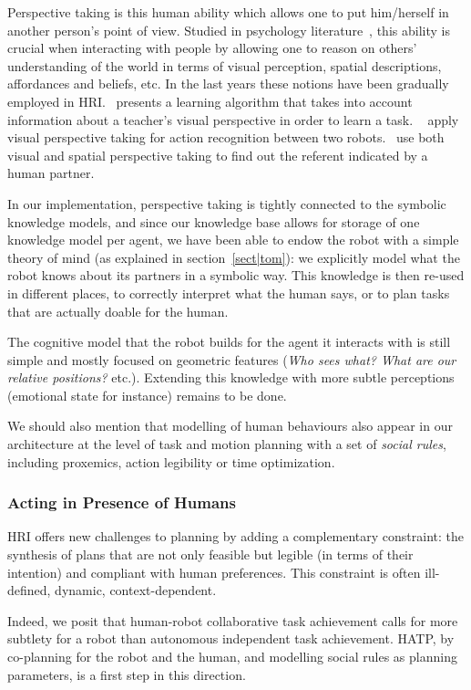 \documentclass[preprint,3p,times]{elsarticle}
\begin{document}
Perspective taking is this human ability which allows one to put him/herself in
another person's point of view. Studied in psychology
literature~\cite{Flavell1992,Tversky1999}, this ability is crucial when
interacting with people by allowing one to reason on others' understanding of
the world in terms of visual perception, spatial descriptions, affordances and
beliefs, etc.  In the last years these notions have been gradually employed in
HRI.~\cite{Breazeal2006} presents a learning algorithm that takes into account
information about a teacher's visual perspective in order to learn a task.
~\cite{Johnson2005} apply visual perspective taking for action recognition
between two robots.~\cite{Trafton2005} use both visual and spatial perspective
taking to find out the referent indicated by a human partner.

In our implementation, perspective taking is tightly connected to the symbolic
knowledge models, and since our knowledge base allows for storage of one
knowledge model per agent, we have been able to endow the robot with a simple
theory of mind (as explained in section~\ref{sect|tom}): we explicitly model
what the robot knows about its partners in a symbolic way. This knowledge is
then re-used in different places, to correctly interpret what the human says,
or to plan tasks that are actually doable for the human.

The cognitive model that the robot builds for the agent it interacts with is
still simple and mostly focused on geometric features (\emph{Who sees what? What are
our relative positions?} etc.). Extending this knowledge with more subtle
perceptions (emotional state for instance) remains to be done.

We should also mention that modelling of human behaviours also appear in our
architecture at the level of task and motion planning with a set of
\emph{social rules}, including proxemics, action legibility or time
optimization.

\subsubsection{Acting in Presence of Humans}

HRI offers new challenges to planning
by adding a complementary constraint: the synthesis of plans that are not only
feasible but legible (in terms of their intention) and compliant with human
preferences. This constraint is often ill-defined, dynamic, context-dependent.

Indeed, we posit that human-robot collaborative task achievement calls for more
subtlety for a robot than autonomous independent task achievement. HATP, by
co-planning for the robot and the human, and modelling social rules as planning
parameters, is a first step in this direction.
\end{document}

